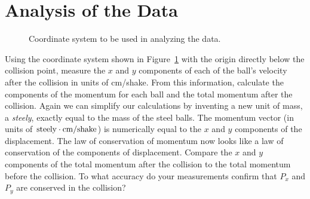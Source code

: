 \section*{Analysis of the Data}
\begin{figure}
\begin{center}
{}
\end{center}
\caption{Coordinate system to be used in analyzing the data.  \label{fig:tb2}}
\end{figure}
     Using the coordinate system shown in Figure~\ref{fig:tb2} with the origin
directly below the collision point, measure the $x$ and $y$ components
of each of the ball's velocity after the collision in units of cm/shake.  From
this information, calculate the components of the momentum for each ball
and the total momentum after the collision.  Again we can simplify
our calculations by inventing a new unit of mass, a {\em steely}, exactly
equal to the mass of the steel balls.  The
momentum vector (in units of ${\rm steely\cdot cm/shake}$) is
numerically equal to the $x$ and $y$ components of the displacement.
The law of conservation of momentum now looks like a law of
conservation of the components of displacement.
Compare the $x$ and $y$ components of the total momentum
after the collision to the total momentum before the collision.  To what
accuracy do your measurements confirm that $P_{x}$ and $P_{y}$ are conserved
in the collision?

